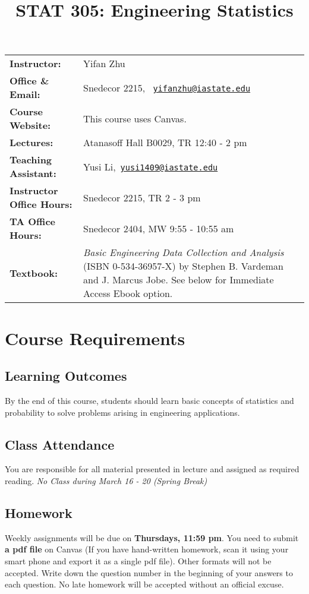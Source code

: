 \documentclass{article}
\title{\vspace{-3em} \bf STAT 305: Engineering Statistics}
\author{}
\date{}
\begin{document}
	\maketitle
	\thispagestyle{fancy}
	\vspace{-3em}
	\begin{tabular}{lp{}}
		{\bf Instructor:} &
	Yifan Zhu \\

		{\bf Office \& Email:} &
		Snedecor 2215, \, \href{mailto: yifanzhu@iastate.edu}{\tt yifanzhu@iastate.edu}\\

		{\bf Course Website:} & This course uses Canvas.\\

		{\bf Lectures:}&  Atanasoff Hall B0029, TR 12:40 - 2 pm\\

		{\bf Teaching Assistant:} & Yusi Li,\,
		\href{mailto: wju@iastate.edu}{\tt yusi1409@iastate.edu}\\

		{\bf Instructor Office Hours:}&  Snedecor 2215, TR 2 - 3 pm\\

		{\bf TA Office Hours:} & Snedecor 2404, MW 9:55 - 10:55 am \\

		{\bf Textbook:} & 

	\emph{Basic Engineering Data Collection and Analysis} (ISBN
	0-534-36957-X) by Stephen B. Vardeman and J. Marcus Jobe. See
	\nameref{ebook} below for Immediate Access Ebook option. 
	\end{tabular}

	\section{Course Requirements}
	\subsection{Learning Outcomes}
By the end of this course, students should learn basic concepts of
statistics and probability to solve problems arising in engineering applications.
	\subsection{Class Attendance}
You are responsible for all material presented in lecture and
assigned as required reading. \emph{No Class during March 16 - 20 (Spring
Break)}
	\subsection{Homework}
	Weekly assignments will be due on {\bf Thursdays, 11:59 pm}. You
	need to submit {\bf a pdf file} on Canvas (If you have hand-written
	homework, scan it using your smart phone and export it as a single pdf file). Other formats will not
	be accepted. Write down the question number in the beginning of
	your answers to each question. No late homework will be
		accepted without an official excuse.
\end{document}
